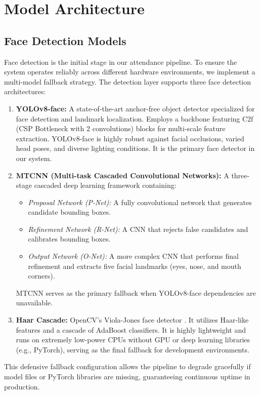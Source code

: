 \chapter{Model Architecture}

\section{Face Detection Models}
Face detection is the initial stage in our attendance pipeline. To ensure the system operates reliably across different hardware environments, we implement a multi-model fallback strategy. The detection layer supports three face detection architectures:

\begin{enumerate}
    \item \textbf{YOLOv8-face:} A state-of-the-art anchor-free object detector specialized for face detection and landmark localization. Employs a backbone featuring C2f (CSP Bottleneck with 2 convolutions) blocks for multi-scale feature extraction. YOLOv8-face is highly robust against facial occlusions, varied head poses, and diverse lighting conditions. It is the primary face detector in our system.
    \item \textbf{MTCNN (Multi-task Cascaded Convolutional Networks):} A three-stage cascaded deep learning framework containing:
    \begin{itemize}
        \item \textit{Proposal Network (P-Net):} A fully convolutional network that generates candidate bounding boxes.
        \item \textit{Refinement Network (R-Net):} A CNN that rejects false candidates and calibrates bounding boxes.
        \item \textit{Output Network (O-Net):} A more complex CNN that performs final refinement and extracts five facial landmarks (eyes, nose, and mouth corners).
    \end{itemize}
    MTCNN serves as the primary fallback when YOLOv8-face dependencies are unavailable.
    \item \textbf{Haar Cascade:} OpenCV's Viola-Jones face detector \cite{viola2001rapid}. It utilizes Haar-like features and a cascade of AdaBoost classifiers. It is highly lightweight and runs on extremely low-power CPUs without GPU or deep learning libraries (e.g., PyTorch), serving as the final fallback for development environments.
\end{enumerate}

This defensive fallback configuration allows the pipeline to degrade gracefully if model files or PyTorch libraries are missing, guaranteeing continuous uptime in production.

